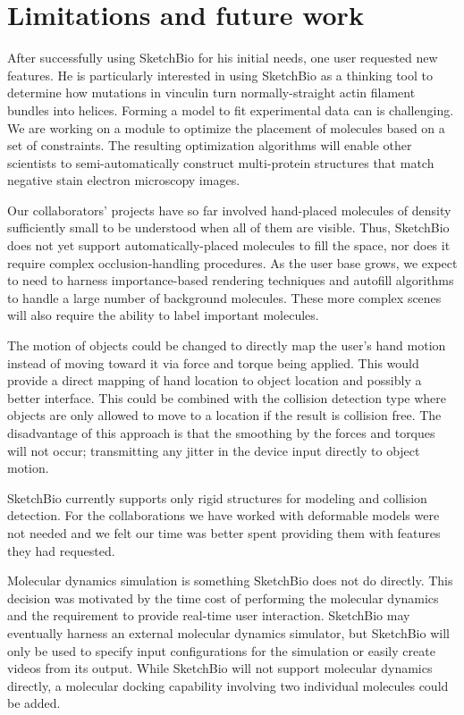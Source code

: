 \documentclass[twocolumn]{bmcart}%
\begin{document}
\section*{Limitations and future work}
After successfully using SketchBio for his initial needs, one user requested new features.
He is particularly interested in using SketchBio as a thinking tool to determine how mutations in vinculin turn normally-straight actin filament bundles into helices.
Forming a model to fit experimental data can is challenging.  We are working on a module to optimize the placement of molecules based on a set of constraints.
The resulting optimization algorithms will enable other scientists to semi-automatically construct multi-protein structures that match negative stain electron microscopy images.

Our collaborators' projects have so far involved hand-placed molecules of density sufficiently small to be understood when all of them are visible.
Thus, SketchBio does not yet support automatically-placed molecules to fill the space, nor does it require complex occlusion-handling procedures.
As the user base grows, we expect to need to harness importance-based rendering techniques and autofill algorithms to handle a large number of background molecules. These more complex scenes will also require the ability to label important molecules.

The motion of objects could be changed to directly map the user's hand motion instead of moving toward it via force and torque being applied.
This would provide a direct mapping of hand location to object location and possibly a better interface.
This could be combined with the collision detection type where objects are only allowed to move to a location if the result is collision free.
The disadvantage of this approach is that the smoothing by the forces and torques will not occur; transmitting any jitter in the device input directly to object motion.

SketchBio currently supports only rigid structures for modeling and collision detection.
For the collaborations we have worked with deformable models were not needed and we felt our time was better spent providing them with features they had requested.

Molecular dynamics simulation is something SketchBio does not do directly.
This decision was motivated by the time cost of performing the molecular dynamics and the requirement to provide real-time user interaction.
SketchBio may eventually harness an external molecular dynamics simulator, but SketchBio will only be used to specify input configurations for the simulation or easily create videos from its output. While SketchBio will not support molecular dynamics directly, a molecular docking capability involving two individual molecules could be added.
\end{document}
